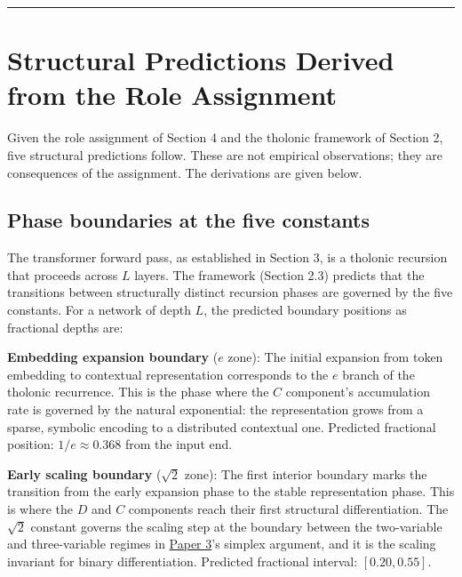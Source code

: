 \documentclass[12pt]{article}
\begin{document}
\begin{center}\rule{0.5\linewidth}{0.5pt}\end{center}

\section{Structural Predictions Derived from the Role Assignment}\label{structural-predictions-derived-from-the-role-assignment}

Given the role assignment of Section 4 and the tholonic framework of
Section 2, five structural predictions follow. These are not empirical
observations; they are consequences of the assignment. The derivations
are given below.

\subsection{Phase boundaries at the five constants}\label{phase-boundaries-at-the-five-constants}

The transformer forward pass, as established in Section 3, is a tholonic
recursion that proceeds across \(L\) layers. The framework (Section 2.3)
predicts that the transitions between structurally distinct recursion
phases are governed by the five constants. For a network of depth \(L\),
the predicted boundary positions as fractional depths are:

\textbf{Embedding expansion boundary} (\(e\) zone): The initial
expansion from token embedding to contextual representation corresponds
to the \(e\) branch of the tholonic recurrence. This is the phase where
the \(C\) component's accumulation rate is governed by the natural
exponential: the representation grows from a sparse, symbolic encoding
to a distributed contextual one. Predicted fractional position:
\(1/e \approx 0.368\) from the input end.

\textbf{Early scaling boundary} (\(\sqrt{2}\) zone): The first interior
boundary marks the transition from the early expansion phase to the
stable representation phase. This is where the \(D\) and \(C\)
components reach their first structural differentiation. The
\(\sqrt{2}\) constant governs the scaling step at the boundary between
the two-variable and three-variable regimes in
\href{https://github.com/baardev/truevalue/blob/main/docnav/Research/papers/3_minimal-recursive-triadic-framework/3_minimal-recursive-triadic-framework.pdf}{Paper
3}'s simplex argument, and it is the scaling invariant for binary
differentiation. Predicted fractional interval: \([0.20, 0.55]\).
\end{document}
